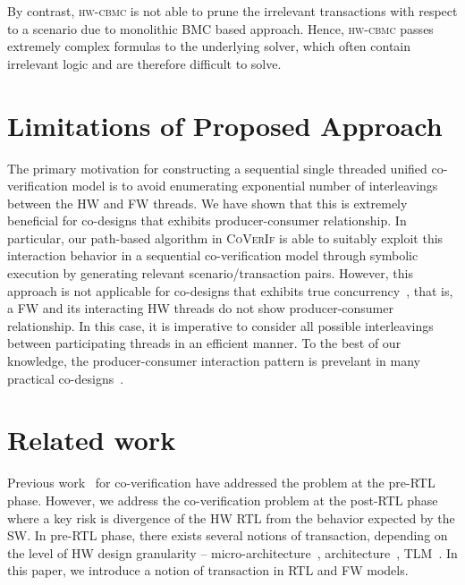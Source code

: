 \documentclass[sigconf]{acmart}
\newcommand{\tool}[1]{\textsc{#1}\xspace}
\newcommand{\hwcbmcv}{\tool{hw-cbmc}}
\newcommand{\verifox}{\tool{CoVerIf}}
\begin{document}
By contrast, \hwcbmcv is not able to prune the irrelevant transactions with
respect to a scenario due to monolithic BMC based approach.  Hence, \hwcbmcv
passes extremely complex formulas to the underlying solver, which often
contain irrelevant logic and are therefore difficult to solve.

\section{Limitations of Proposed Approach}
The primary motivation for constructing a sequential single threaded unified 
co-verification model is to avoid enumerating exponential number of interleavings 
between the HW and FW threads.  We have shown that this is extremely beneficial for 
co-designs that exhibits producer-consumer relationship.  
In particular, our path-based algorithm in \verifox is able to suitably exploit 
this interaction behavior in a sequential co-verification model through symbolic 
execution by generating relevant scenario/transaction pairs.  However, this approach 
is not applicable for co-designs that exhibits true concurrency~\cite{codesign}, 
that is, a FW and its interacting HW threads do not show producer-consumer relationship.  
In this case, it is imperative to consider all possible interleavings between participating 
threads in an efficient manner.  To the best of our knowledge, the producer-consumer 
interaction pattern is prevelant in many practical 
co-designs~\cite{polig2014micro,polig2014fpl,giefers2015accelerating,hvc}. 


\section{Related work}

Previous work~\cite{codes14,codes15,fmcad13,memocode06} for 
co-verification have addressed the problem at the pre-RTL phase. 
However, we address the co-veri\-fi\-cation problem at the post-RTL
phase~\cite{fase10,vlsid13} where a key risk is divergence of the 
HW RTL from the behavior expected by the SW. In pre-RTL phase, 
there exists several notions of transaction, depending on the level 
of HW design granularity -- micro-architecture~\cite{mcbmq},
architecture~\cite{mcbmq}, TLM~\cite{tlm-book,hvc}. In this paper, 
we introduce a notion of transaction in RTL and FW models.      
\end{document}
